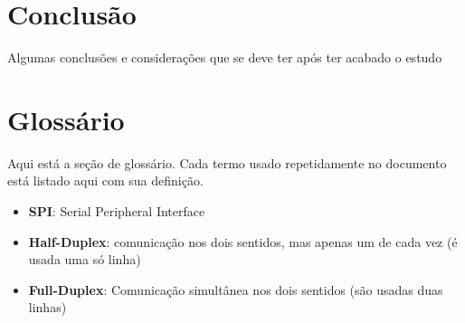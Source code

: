 \documentclass[a4paper, 11pt, onecolumn, twoside]{article}
\begin{document}
\section{Conclusão}
Algumas conclusões e considerações que se deve ter após
ter acabado o estudo

\clearpage
\section{Glossário}\label{sec:glossary}

Aqui está a seção de glossário. Cada termo usado repetidamente no documento está listado aqui com sua definição.

\begin{itemize}
    \item\label{spi} \textbf{SPI}: Serial Peripheral Interface
    \item\label{halfduplex} \textbf{Half-Duplex}: comunicação nos dois sentidos, mas apenas um de
    cada vez (é usada uma só linha)
    \item\label{fullduplex} \textbf{Full-Duplex}: Comunicação simultânea nos dois sentidos (são
    usadas duas linhas)
\end{itemize}
\end{document}
